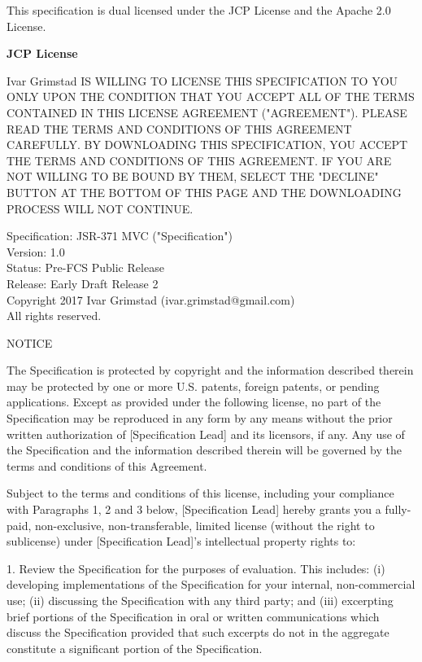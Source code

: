 \begin{flushleft}

This specification is dual licensed under the JCP License and the Apache 2.0 License.

\begin{center}
{\bfseries JCP License}
\end{center}

Ivar Grimstad IS WILLING TO LICENSE THIS SPECIFICATION TO YOU ONLY UPON THE CONDITION THAT YOU ACCEPT ALL OF THE TERMS CONTAINED IN THIS LICENSE AGREEMENT ("AGREEMENT"). PLEASE READ THE TERMS AND CONDITIONS OF THIS AGREEMENT CAREFULLY. BY DOWNLOADING THIS SPECIFICATION, YOU ACCEPT THE TERMS AND CONDITIONS OF THIS AGREEMENT. IF YOU ARE NOT WILLING TO BE BOUND BY THEM, SELECT THE "DECLINE" BUTTON AT THE BOTTOM OF THIS PAGE AND THE DOWNLOADING PROCESS WILL NOT CONTINUE.

Specification:  JSR-371 MVC ("Specification")\\
Version: 1.0\\
Status: Pre-FCS Public Release\\
Release: Early Draft Release 2\\
Copyright 2017 Ivar Grimstad (ivar.grimstad@gmail.com)\\
All rights reserved.

NOTICE

The Specification is protected by copyright and the information described therein may be protected by one or more U.S. patents, foreign patents, or pending applications. Except as provided under the following license, no part of the Specification may be reproduced in any form by any means without the prior written authorization of [Specification Lead] and its
licensors, if any. Any use of the Specification and the information described therein will be governed by the terms and conditions of this Agreement.

Subject to the terms and conditions of this license, including your compliance with Paragraphs 1, 2 and 3 below, [Specification Lead] hereby grants you a fully-paid, non-exclusive, non-transferable, limited license (without the right to sublicense) under [Specification Lead]'s intellectual property rights to:

   1. Review the Specification for the purposes of evaluation. This includes: (i) developing implementations of the Specification for your internal, non-commercial use; (ii) discussing the Specification with any third party; and (iii) excerpting brief portions of the Specification in oral or written communications which discuss the Specification provided that such excerpts do not in the aggregate constitute a significant portion of the Specification.


\end{flushleft}
